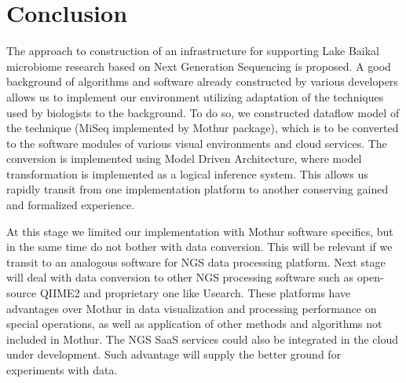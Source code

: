 \documentclass[a4paper]{jpconf}
\begin{document}











\section*{Conclusion}

The approach to construction of an infrastructure for supporting Lake Baikal microbiome research based on Next Generation Sequencing is proposed. A good background of algorithms and software already constructed by various developers allows us to implement our environment utilizing adaptation of the techniques used by biologists to the background.  To do so, we constructed dataflow model of the technique (MiSeq implemented by Mothur package), which is to be converted to the software modules of various visual environments and cloud services.  The conversion is implemented using Model Driven Architecture, where model transformation is implemented as a logical inference system. This allows us rapidly transit from one implementation platform to another conserving gained and formalized experience.

At this stage we limited our implementation with Mothur software specifics, but in the same time do not bother with data conversion.  This will be relevant if we transit to an analogous software for NGS data processing platform.  Next stage will deal with data conversion to other NGS processing software such as open-source QIIME2 and proprietary one like Usearch.  These platforms have advantages over Mothur in data visualization and processing performance on special operations, as well as application of other methods and algorithms not included in Mothur. The NGS SaaS services \cite{guo16,kwon15} could also be integrated in the cloud under development.  Such advantage will supply the better ground for experiments with data.
\end{document}
